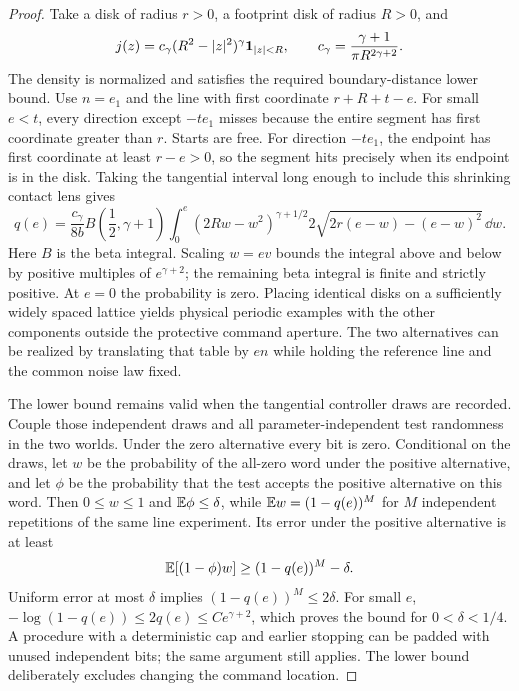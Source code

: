 \begin{proof}
Take a disk of radius $r>0$, a footprint disk of radius $R>0$, and
\[
 j(z)=c_\gamma(R^2-|z|^2)^\gamma\mathbf 1_{|z|<R},\qquad
              c_\gamma=\frac{\gamma+1}{\pi R^{2\gamma+2}}.
\]
The density is normalized and satisfies the required boundary-distance
lower bound. Use $n=e_1$ and the line with first coordinate
$r+R+t-e$. For small $e<t$, every direction except $-te_1$ misses
because the entire segment has first coordinate greater than $r$.
Starts are free. For direction $-te_1$, the endpoint has first
coordinate at least $r-e>0$, so the segment hits precisely when its
endpoint is in the disk. Taking the tangential interval long enough
to include this shrinking contact lens gives
\[
 q(e)=\frac{c_\gamma}{8b}
 B\!\left(\frac12,\gamma+1\right)
 \int_0^e (2Rw-w^2)^{\gamma+1/2}
                 2\sqrt{2r(e-w)-(e-w)^2}\,\dd w.
\]
Here $B$ is the beta integral. Scaling $w=ev$ bounds the integral
above and below by positive multiples of $e^{\gamma+2}$; the
remaining beta integral is finite and strictly positive. At $e=0$
the probability is zero. Placing identical disks on a sufficiently
widely spaced lattice yields physical periodic examples with the
other components outside the protective command aperture. The two
alternatives can be realized by translating that table by $en$ while
holding the reference line and the common noise law fixed.

The lower bound remains valid when the tangential controller draws
are recorded. Couple those independent draws and all parameter-independent
test randomness in the two worlds. Under the zero alternative every bit
is zero. Conditional on the draws, let $w$ be the probability of the
all-zero word under the positive alternative, and let $\phi$ be the
probability that the test accepts the positive alternative on this word.
Then $0\le w\le1$ and $\mathbb E\phi\le\delta$, while
$\mathbb E w=(1-q(e))^M$ for $M$ independent repetitions of the same line
experiment. Its error under the positive alternative is at least
\[
 \mathbb E[(1-\phi)w]\ge (1-q(e))^M-\delta.
\]
Uniform error at most $\delta$ implies $(1-q(e))^M\le2\delta$.
For small $e$, $-\log(1-q(e))\le2q(e)\le C e^{\gamma+2}$,
which proves the bound for $0<\delta<1/4$.
A procedure with a deterministic cap and earlier stopping can be
padded with unused independent bits; the same argument still applies.
The lower bound deliberately excludes changing the command location.
\end{proof}
